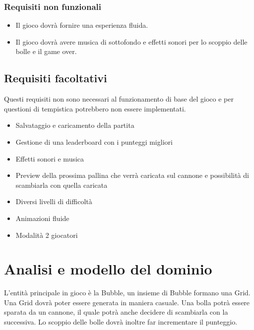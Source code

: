 \documentclass[a4paper,12pt]{report}
\begin{document}
\subsubsection{Requisiti non funzionali}
\begin{itemize}
	\item Il gioco dovrà fornire una esperienza fluida.
	\item Il gioco dovrà avere musica di sottofondo e effetti sonori per lo scoppio delle bolle e il game over.
\end{itemize}

\subsection{Requisiti facoltativi}
Questi requisiti non sono necessari al funzionamento di base del gioco e per questioni di tempistica potrebbero non essere implementati.
\begin{itemize}
	\item Salvataggio e caricamento della partita
	\item Gestione di una leaderboard con i punteggi migliori
	\item Effetti sonori e musica
	\item Preview della prossima pallina che verrà caricata sul cannone e possibilità di scambiarla con quella caricata
	\item Diversi livelli di difficoltà
	\item Animazioni fluide
	\item Modalità 2 giocatori
\end{itemize}

\section{Analisi e modello del dominio}

L'entità principale in gioco è la Bubble, un insieme di Bubble formano una Grid. Una Grid dovrà poter essere generata in maniera casuale.
Una bolla potrà essere sparata da un cannone, il quale potrà anche decidere di scambiarla con la successiva. Lo scoppio delle bolle dovrà inoltre far incrementare il punteggio.
\end{document}
